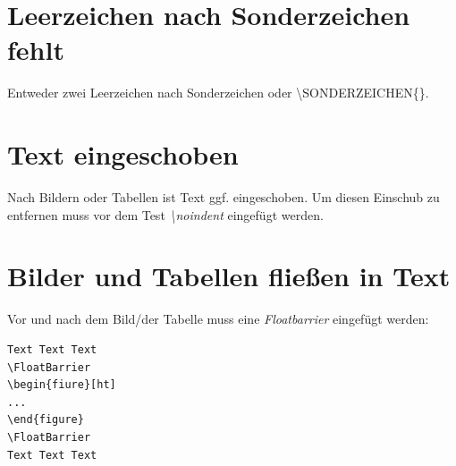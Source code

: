 \documentclass[12pt]{article}
\begin{document}
\section{Leerzeichen nach Sonderzeichen fehlt}
Entweder zwei Leerzeichen nach Sonderzeichen oder \textbackslash SONDERZEICHEN\{\}.

\section{Text eingeschoben}
Nach Bildern oder Tabellen ist Text ggf. eingeschoben. Um diesen Einschub zu entfernen muss vor dem Test \textit{\textbackslash noindent} eingefügt werden.

\section{Bilder und Tabellen fließen in Text}
Vor und nach dem Bild/der Tabelle muss eine \textit{Floatbarrier} eingefügt werden:
\begin{verbatim}
Text Text Text
\FloatBarrier
\begin{fiure}[ht]
...
\end{figure}
\FloatBarrier
Text Text Text
\end{verbatim}


\clearpage
\frontmatter%
\renewcommand{\plaintitle}{Literaturverzeichnis}
\setcounter{page}{5}
\printMyBibliography
\clearpage
\renewcommand{\plaintitle}{Anhang}
{\def\makebox[#1][#2]#3{#3}%
    \listofanhang
}
\end{document}
